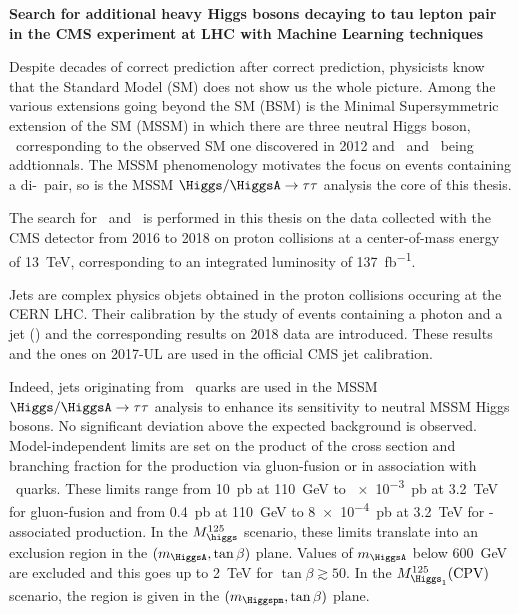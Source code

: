 \begin{center}
\LARGE
\bf
\sffamily
Search for additional heavy Higgs bosons decaying to tau lepton pair in the CMS experiment at LHC with Machine Learning techniques
\end{center}
\bigskip

Despite decades of correct prediction after correct prediction,
physicists know that the Standard Model (SM) does not show us the whole picture.
Among the various extensions going beyond the SM (BSM)
is the
Minimal Supersymmetric extension of the SM (MSSM)
in which
there are three neutral Higgs boson,
\higgs\ corresponding to the observed SM one discovered in 2012
and
\Higgs\ and \HiggsA\ being addtionnals.
The MSSM phenomenology motivates the focus on events containing a di-\tau\ pair,
so is the MSSM $\Higgs/\HiggsA\to\tau\tau$ analysis the core of this thesis.
\par
The search
for \Higgs\ and \HiggsA\ 
is performed
in this thesis
on the data collected
with the CMS detector from 2016 to 2018
on proton collisions
at a center-of-mass energy of \SI{13}{\TeV},
corresponding to an integrated luminosity of \SI{137}{\femto\barn^{-1}}.
\par
Jets are complex physics objets
obtained
in the proton collisions occuring at the CERN LHC.
Their calibration by
the study of events containing a photon and a jet (\Gjet)
and the corresponding results on 2018 data
are introduced.
These results and the ones on 2017-UL
are used in the official CMS jet calibration.
\par
Indeed,
jets originating from \quarkb~quarks are used in the MSSM $\Higgs/\HiggsA\to\tau\tau$ analysis
to enhance its sensitivity to neutral MSSM Higgs bosons.
No significant deviation above the expected background is observed.
Model-independent limits are set
on the product of the cross section and branching fraction
for the production
via gluon-fusion
or
in association with \quarkb~quarks.
These limits range
from
\SI{10}{\pico\barn} at \SI{110}{\GeV}
to
\SI{e-3}{\pico\barn} at \SI{3.2}{\TeV}
for gluon-fusion
and from
\SI{0.4}{\pico\barn} at \SI{110}{\GeV}
to
\SI{8e-4}{\pico\barn} at \SI{3.2}{\TeV}
for \quarkb-associated production.
In the $M_{\higgs}^{125}$ scenario,
these limits translate into
an exclusion region in the $(m_{\HiggsA},\tan\beta)$ plane.
Values of $m_{\HiggsA}$ below \SI{600}{\GeV} are excluded
and this goes up to 
\SI{2}{\TeV} for $\tan\beta\gtrsim\num{50}$.
In the $M_{\Higgs_1}^{125}(\text{CPV})$ scenario,
the region is given in the $(m_{\Higgspm},\tan\beta)$ plane.
